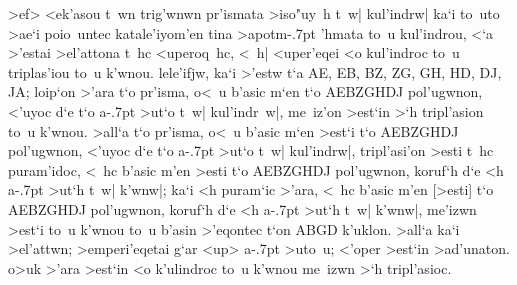 \begin{Parallel}{}{}
{{>ef> <ek'asou t~wn trig'wnwn pr'ismata >iso"uy~h t~w| kul'indrw| ka`i to~uto >ae`i poio~untec katale'iyom'en
tina >apotm\kern -.7pt 'hmata to~u kul'indrou, <`a >'estai >el'attona t~hc <uperoq~hc, <~h| <uper'eqei <o kul'indroc to~u
triplas'iou to~u k'wnou. lele'ifjw, ka`i >'estw t`a AE, EB, BZ, ZG, GH, HD, DJ, JA; loip`on >'ara t`o pr'isma, o<~u
b'asic m`en t`o AEBZGHDJ pol'ugwnon, <'uyoc d`e t`o a\kern -.7pt >ut`o t~w| kul'indr~w|, me~iz'on >est`in >`h
tripl'asion to~u k'wnou. 
>all`a t`o pr'isma, o<~u b'asic m`en >est`i t`o AEBZGHDJ pol'ugwnon, <'uyoc d`e t`o a\kern -.7pt >ut`o t~w| kul'indrw|, tripl'asi'on
>esti t~hc puram'idoc, <~hc b'asic m'en >esti t`o AEBZGHDJ
pol'ugwnon, 
koruf`h d`e
<h a\kern -.7pt >ut`h t~w| k'wnw|; ka`i <h puram`ic >'ara, <~hc b'asic m'en [>esti] t`o AEBZGHDJ pol'ugwnon, koruf`h
d`e <h a\kern -.7pt >ut`h t~w| k'wnw|, me'izwn >est`i to~u k'wnou to~u b'asin >'eqontec t`on ABGD k'uklon.
 >all`a ka`i
>el'attwn; >emperi'eqetai g`ar <up> a\kern -.7pt >uto~u; <'oper >est`in >ad'unaton. o>uk >'ara >est`in <o k'ulindroc
to~u k'wnou me~izwn >`h tripl'asioc.}


}
\end{Parallel}
